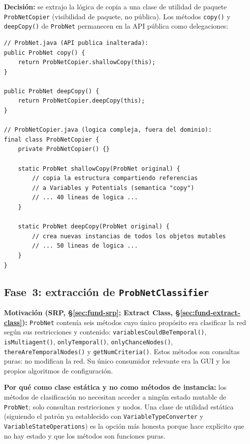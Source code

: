 \documentclass[11pt,a4paper]{article}
\newcommand{\code}[1]{\texttt{#1}}
\begin{document}
\textbf{Decisión:} se extrajo la lógica de copia a una clase de utilidad
de paquete \code{ProbNetCopier} (visibilidad de paquete, no pública).
Los métodos \code{copy()} y \code{deepCopy()} de \code{ProbNet}
permanecen en la API pública como delegaciones:

\begin{lstlisting}[caption={Extracción de la lógica de copia a \texttt{ProbNetCopier}.},
                   label=lst:copier]
// ProbNet.java (API publica inalterada):
public ProbNet copy() {
    return ProbNetCopier.shallowCopy(this);
}

public ProbNet deepCopy() {
    return ProbNetCopier.deepCopy(this);
}

// ProbNetCopier.java (logica compleja, fuera del dominio):
final class ProbNetCopier {
    private ProbNetCopier() {}

    static ProbNet shallowCopy(ProbNet original) {
        // copia la estructura compartiendo referencias
        // a Variables y Potentials (semantica "copy")
        // ... 40 lineas de logica ...
    }

    static ProbNet deepCopy(ProbNet original) {
        // crea nuevas instancias de todos los objetos mutables
        // ... 50 lineas de logica ...
    }
}
\end{lstlisting}

\subsection{Fase~3: extracción de \texttt{ProbNetClassifier}}
\label{sec:classifier}

\textbf{Motivación (SRP, §\ref{sec:fund-srp}; Extract Class,
§\ref{sec:fund-extract-class}):}
\code{ProbNet} contenía seis métodos cuyo único propósito era clasificar
la red según sus restricciones y contenido: \code{variablesCouldBeTemporal()},
\code{isMultiagent()}, \code{onlyTemporal()}, \code{onlyChanceNodes()},
\code{thereAreTemporalNodes()} y \code{getNumCriteria()}.  Estos métodos
son consultas puras: no modifican la red.  Su único consumidor relevante
era la GUI y los propios algoritmos de configuración.

\textbf{Por qué como clase estática y no como métodos de instancia:}
los métodos de clasificación no necesitan acceder a ningún estado
mutable de \code{ProbNet}; solo consultan restricciones y nodos.  Una
clase de utilidad estática (siguiendo el patrón ya establecido con
\code{VariableTypeConverter} y \code{VariableStateOperations}) es la
opción más honesta porque hace explícito que no hay estado y que los
métodos son funciones puras.
\end{document}
